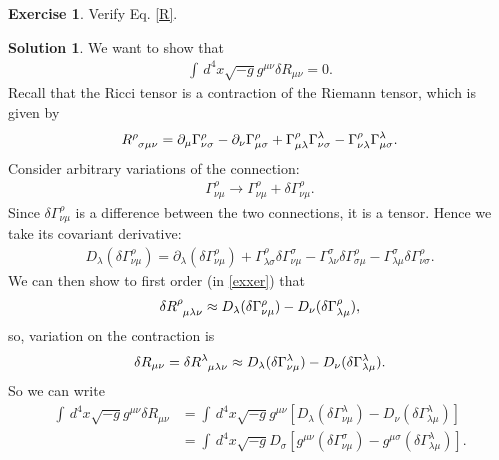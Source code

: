 \documentclass{book}
\numberwithin{equation}{section}
\theoremstyle{definition}
\newtheorem{exmp}{Exercise}[section]
\newtheorem{sln}{Solution}[section]
\newcommand{\p}{\partial}
\newcommand{\lb}{\left[}
\newcommand{\rb}{\right]}
\begin{document}
\begin{exmp}
	Verify Eq. \eqref{R}.\\
	
	\begin{sln}
		We want to show that
		\begin{align}
		\int \,d^4x \sqrt{-g}g^{\mu\nu}\delta R_{\mu\nu} = 0.
		\end{align}
		Recall that the Ricci tensor is a contraction of the Riemann tensor, which is given by
		\begin{align}
		\tensor{R}{^\rho_{\sigma\mu\nu}} = \p_\mu \Gamma^\rho_{\nu\sigma} - \p_\nu \Gamma^\rho_{\mu\sigma} + \Gamma^\rho _{\mu\lambda}\Gamma^\lambda_{\nu\sigma} - \Gamma^\rho_{\nu\lambda} \Gamma^\lambda_{\mu\sigma}.
		\end{align}
		Consider arbitrary variations of the connection:
		\begin{align}
		\Gamma^\rho_{\nu\mu} \to \Gamma^\rho_{\nu\mu} + \delta \Gamma^\rho_{\nu\mu}.
		\end{align}
		Since $\delta \Gamma^\rho_{\nu\mu}$ is a difference between the two connections, it is a tensor. Hence we take its covariant derivative:
		\begin{align}
		D_\lambda (\delta \Gamma^\rho_{\nu\mu}) = \p_\lambda (\delta \Gamma^\rho_{\nu\mu}) + \Gamma^\rho_{\lambda\sigma} \delta \Gamma^\sigma_{\nu\mu} - \Gamma^\sigma_{\lambda\nu} \delta \Gamma^\rho_{\sigma\mu} - \Gamma^\sigma_{\lambda\mu} \delta \Gamma^\rho_{\nu\sigma}.
		\end{align}
		We can then show to first order (in \ref{exxer}) that
		\begin{align}\label{approx}
		\delta \tensor{R}{^\rho_{\mu\lambda\nu}} \approx D_\lambda (\delta \Gamma^\rho_{\nu\mu}) - D_\nu (\delta \Gamma^\rho_{\lambda\mu}),
		\end{align}
		so, variation on the contraction is
		\begin{align}
		\delta R_{\mu\nu} = \delta \tensor{R}{^\lambda_{\mu\lambda\nu}} \approx D_\lambda (\delta \Gamma^\lambda_{\nu\mu}) - D_\nu (\delta \Gamma^\lambda_{\lambda\mu}).
		\end{align}
		So we can write
		\begin{align}\label{step}
		\int \,d^4x \sqrt{-g}g^{\mu\nu}\delta R_{\mu\nu} &= \int \,d^4x \sqrt{-g}g^{\mu\nu} \lb D_\lambda (\delta \Gamma^\lambda_{\nu\mu}) - D_\nu (\delta \Gamma^\lambda_{\lambda\mu})  \rb\\
		&= \int \,d^4x \sqrt{-g}   D_\sigma \lb g^{\mu\nu} (\delta \Gamma^\sigma_{\nu\mu}) - g^{\mu\sigma} (\delta \Gamma^\lambda_{\lambda\mu})  \rb.

\end{align}
\end{sln}
\end{exmp}
\end{document}
